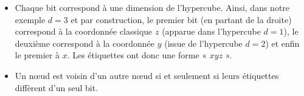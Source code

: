 \begin{itemize}
\item Chaque bit correspond à une dimension de l'hypercube. Ainsi, dans notre exemple $d=3$ et par construction, le premier bit (en partant de la droite) correspond à la coordonnée classique $z$ (apparue dans l'hypercube $d=1$), le deuxième correspond à la coordonnée $y$ (issue de l'hypercube $d=2$) et enfin le premier à $x$. Les étiquettes ont donc une forme « $xyz$ ».
\item Un nœud est voisin d'un autre nœud si et seulement si leurs étiquettes diffèrent d'un seul bit.

\end{itemize}